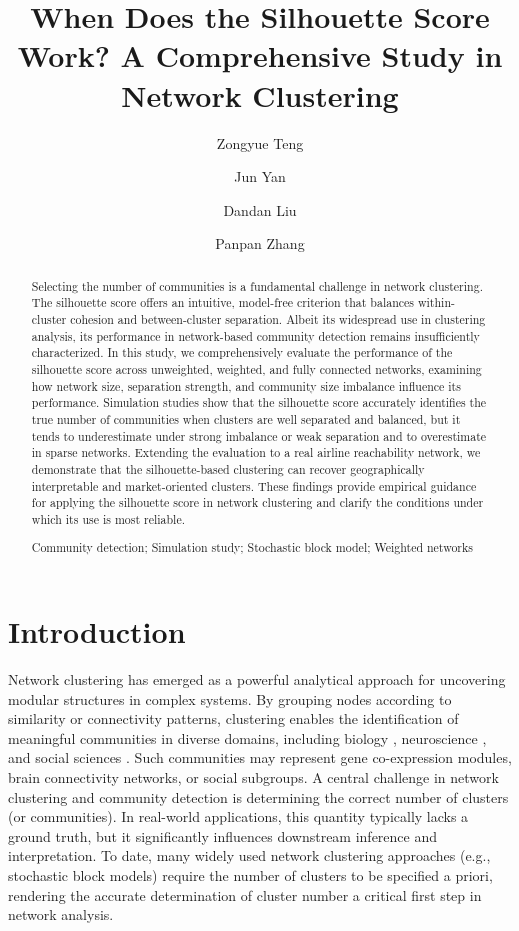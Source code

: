 \documentclass[12pt, titlepage, reqno]{article}
\title{When Does the Silhouette Score Work? A Comprehensive Study in 
Network Clustering}
\author[1]{Zongyue Teng}
\author[2]{Jun Yan}
\author[1]{Dandan Liu}
\author[1,*]{Panpan Zhang}
\affil[1]{Department of Biostatistics, Vanderbilt University Medical 
Center, Nashville, TN 37203, USA}
\affil[2]{Department of Statistics, University of Connecticut, 
Storrs, CT 06269, USA}
\affil[*]{Correspondence: \href{mailto:panpan.zhang@vumc.org}{Panpan 
Zhang}}
\begin{document}
	
\maketitle
	
\begin{abstract}
Selecting the number of communities is a fundamental challenge in 
network clustering. The silhouette score offers an intuitive, 
model-free criterion that balances within-cluster cohesion and 
between-cluster separation. Albeit its widespread use in clustering 
analysis, its performance in network-based community detection 
remains insufficiently characterized. In this study, we 
comprehensively evaluate the performance of the silhouette score 
across unweighted, weighted, and fully connected networks, examining 
how network size, separation strength, and community size imbalance 
influence its performance. Simulation studies show that the 
silhouette score accurately identifies the true number of 
communities when clusters are well separated and balanced, but it 
tends to underestimate under strong imbalance or weak separation and 
to overestimate in sparse networks. Extending the evaluation to a 
real airline reachability network, we demonstrate that the 
silhouette-based clustering can recover geographically interpretable 
and market-oriented clusters. These findings provide 
empirical guidance for applying the 
silhouette score in network clustering and clarify the conditions 
under which its use is most reliable.


\bigskip
{}
Community detection;
Simulation study;
Stochastic block model;
Weighted networks
\end{abstract}

\doublespacing

\section{Introduction}


Network clustering has emerged as a powerful analytical approach for 
uncovering modular structures in complex systems. By grouping nodes
according to similarity or connectivity patterns, clustering enables
the identification of meaningful communities in diverse domains,
including biology \citep{pavlopoulos2011using}, neuroscience
\citep{sporns2016modular}, and social sciences
\citep{ouyang2020clique,ouyang2023amixed}. Such communities may
represent gene co-expression modules, brain connectivity networks,
or social subgroups. A central challenge in network clustering and 
community detection is determining the correct number of clusters (or 
communities). In real-world applications, this quantity typically 
lacks a ground truth, but it significantly influences downstream 
inference and interpretation. To date, many widely used network 
clustering approaches (e.g., stochastic block models) require the 
number of clusters to be specified a priori, rendering the accurate 
determination of cluster number a critical first step in network 
analysis.
\end{document}
